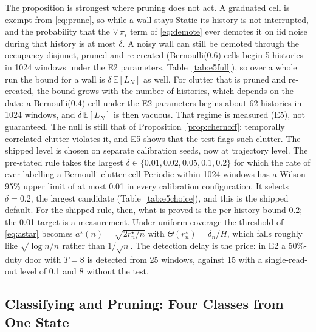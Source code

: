 The proposition is strongest where pruning does not act. A graduated cell is exempt from \eqref{eq:prune}, so while a wall stays Static its history is not interrupted, and the probability that the $\lor\,\pi_i$ term of \eqref{eq:demote} ever demotes it on iid noise during that history is at most $\delta$. A noisy wall can still be demoted through the occupancy disjunct, pruned and re-created (Bernoulli(0.6) cells begin 5 histories in 1024 windows under the E2 parameters, Table~\ref{tab:e5full}), so over a whole run the bound for a wall is $\delta\,\mathbb{E}[L_N]$ as well. For clutter that is pruned and re-created, the bound grows with the number of histories, which depends on the data: a Bernoulli(0.4) cell under the E2 parameters begins about 62 histories in 1024 windows, and $\delta\,\mathbb{E}[L_N]$ is then vacuous. That regime is measured (E5), not guaranteed. The null is still that of Proposition~\ref{prop:chernoff}: temporally correlated clutter violates it, and E5 shows that the test flags such clutter. The shipped level is chosen on separate calibration seeds, now at trajectory level. The pre-stated rule takes the largest $\delta\in\{0.01,0.02,0.05,0.1,0.2\}$ for which the rate of ever labelling a Bernoulli clutter cell Periodic within 1024 windows has a Wilson 95\% upper limit \citep{wilson1927} of at most 0.01 in every calibration configuration. It selects $\delta{=}0.2$, the largest candidate (Table~\ref{tab:e5choice}), and this is the shipped default. For the shipped rule, then, what is proved is the per-history bound 0.2; the 0.01 target is a measurement. Under uniform coverage the threshold of \eqref{eq:astar} becomes $a^\star(n)=\sqrt{2r^\star_n/n}$ with $\Theta(r^\star_n)=\delta_n/H$, which falls roughly like $\sqrt{\log n/n}$ rather than $1/\sqrt n$. The detection delay is the price: in E2 a 50\%-duty door with $T{=}8$ is detected from 25 windows, against 15 with a single-read-out level of 0.1 and 8 without the test.

\subsection{Classifying and Pruning: Four Classes from One State}\label{subsec:classify}

